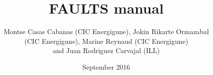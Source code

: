 \documentclass[a4paper,11pt]{report}
\begin{document}
  
\sloppy %
\title{\Huge\bf FAULTS manual}
\author{Montse Casas Cabanas (CIC Energigune), Jokin Rikarte Ormazabal \\
(CIC Energigune), Marine Reynaud (CIC Energigune) \\
and Juan Rodriguez Carvajal (ILL)}
\date{September 2016}
\maketitle
\tableofcontents




%
%
%
\end{document}

